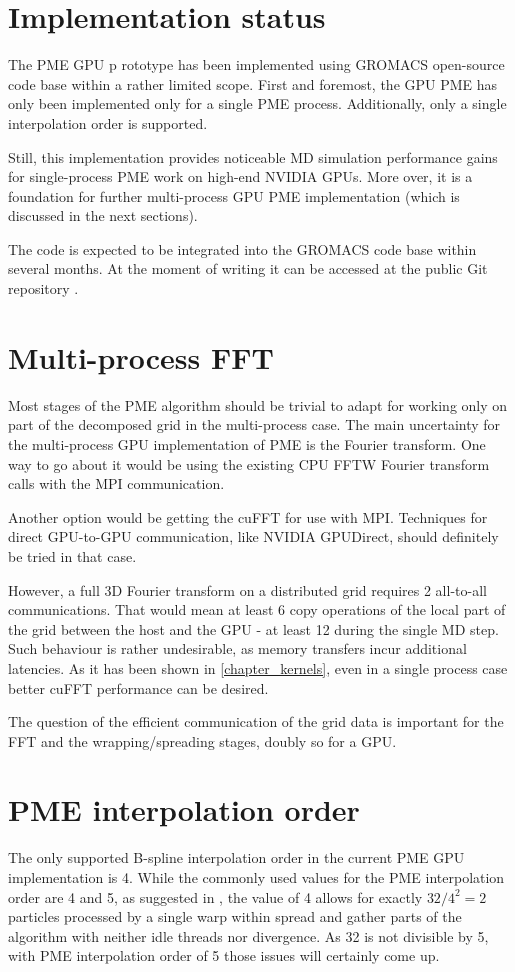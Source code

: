\documentclass[12pt,a4paper]{report}
\begin{document}
\section{Implementation status}
The PME GPU p  rototype has been implemented using GROMACS open-source code base within a rather limited scope. First and foremost, the GPU PME has only been implemented only for a single PME process. Additionally, only a single interpolation order is supported.

Still, this implementation provides noticeable MD simulation performance gains for single-process PME work on high-end NVIDIA GPUs.
More over, it is a foundation for further multi-process GPU PME implementation (which is discussed in the next sections).

The code is expected to be integrated into the GROMACS code base within several months. At the moment of writing it can be accessed at the public Git repository \cite{pmegpugit}.

\section{Multi-process FFT}

Most stages of the PME algorithm should be trivial to adapt for working only on part of the decomposed grid in the multi-process case.
The main uncertainty for the multi-process GPU implementation of PME is the Fourier transform. One way to go about it would be using the existing CPU FFTW Fourier transform calls with the MPI communication.

Another option would be getting the cuFFT for use with MPI. Techniques for direct GPU-to-GPU communication, like NVIDIA GPUDirect, should definitely be tried in that case.

However, a full 3D Fourier transform on a distributed grid requires 2 all-to-all communications. That would mean at least 6 copy operations of the local part of the grid between the host and the GPU - at least 12 during the single MD step. Such behaviour is rather undesirable, as memory transfers incur additional latencies.
As it has been shown in \ref{chapter_kernels}, even in a single process case better cuFFT performance can be desired.

The question of the efficient communication of the grid data is important for the FFT and the wrapping/spreading stages, doubly so for a GPU.
 
\section{PME interpolation order}
The only supported B-spline interpolation order in the current PME GPU implementation is 4. While the commonly used values for the PME interpolation order are 4 and 5, as suggested in \cite{spme}, the value of 4 allows for exactly $32/4^2 = 2$ particles processed by a single warp within spread and gather parts of the algorithm with neither idle threads nor divergence. As 32 is not divisible by 5, with PME interpolation order of 5 those issues will certainly come up.
\end{document}
